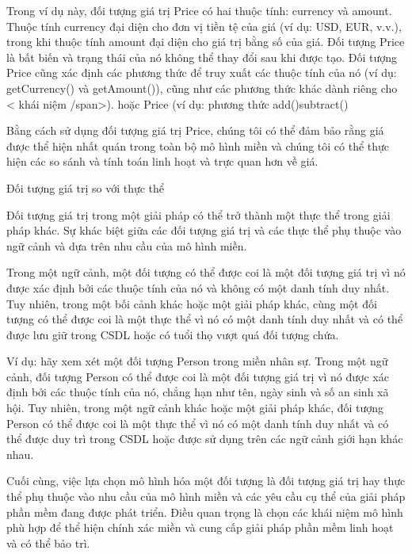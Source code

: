 Trong ví dụ này, đối tượng giá trị Price có hai thuộc tính: currency và amount. Thuộc tính currency đại diện cho đơn vị tiền tệ của giá (ví dụ: USD, EUR, v.v.), trong khi thuộc tính amount đại diện cho giá trị bằng số của giá. Đối tượng Price là bất biến và trạng thái của nó không thể thay đổi sau khi được tạo. Đối tượng Price cũng xác định các phương thức để truy xuất các thuộc tính của nó (ví dụ: getCurrency() và getAmount()), cũng như các phương thức khác dành riêng cho < khái niệm /span>). hoặc Price (ví dụ: phương thức add()subtract()

Bằng cách sử dụng đối tượng giá trị Price, chúng tôi có thể đảm bảo rằng giá được thể hiện nhất quán trong toàn bộ mô hình miền và chúng tôi có thể thực hiện các so sánh và tính toán linh hoạt và trực quan hơn về giá.

Đối tượng giá trị so với thực thể

Đối tượng giá trị trong một giải pháp có thể trở thành một thực thể trong giải pháp khác. Sự khác biệt giữa các đối tượng giá trị và các thực thể phụ thuộc vào ngữ cảnh và dựa trên nhu cầu của mô hình miền.

Trong một ngữ cảnh, một đối tượng có thể được coi là một đối tượng giá trị vì nó được xác định bởi các thuộc tính của nó và không có một danh tính duy nhất. Tuy nhiên, trong một bối cảnh khác hoặc một giải pháp khác, cùng một đối tượng có thể được coi là một thực thể vì nó có một danh tính duy nhất và có thể được lưu giữ trong CSDL hoặc có tuổi thọ vượt quá đối tượng chứa.

Ví dụ: hãy xem xét một đối tượng Person trong miền nhân sự. Trong một ngữ cảnh, đối tượng Person có thể được coi là một đối tượng giá trị vì nó được xác định bởi các thuộc tính của nó, chẳng hạn như tên, ngày sinh và số an sinh xã hội. Tuy nhiên, trong một ngữ cảnh khác hoặc một giải pháp khác, đối tượng Person có thể được coi là một thực thể vì nó có một danh tính duy nhất và có thể được duy trì trong CSDL hoặc được sử dụng trên các ngữ cảnh giới hạn khác nhau.

Cuối cùng, việc lựa chọn mô hình hóa một đối tượng là đối tượng giá trị hay thực thể phụ thuộc vào nhu cầu của mô hình miền và các yêu cầu cụ thể của giải pháp phần mềm đang được phát triển. Điều quan trọng là chọn các khái niệm mô hình phù hợp để thể hiện chính xác miền và cung cấp giải pháp phần mềm linh hoạt và có thể bảo trì.




